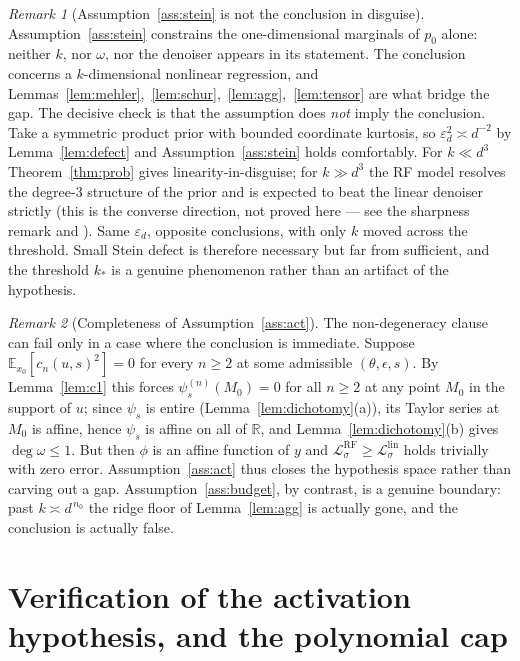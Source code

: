 \documentclass[11pt]{article}
\theoremstyle{remark}
\newtheorem{remark}{Remark}
\newcommand{\E}{\mathbb{E}}
\newcommand{\R}{\mathbb{R}}
\begin{document}
\begin{remark}[Assumption~\ref{ass:stein} is not the conclusion in disguise]\label{rem:noncirc}
Assumption~\ref{ass:stein} constrains the one-dimensional marginals of $p_0$ alone: neither $k$, nor $\omega$, nor the denoiser appears in its statement. The conclusion concerns a $k$-dimensional nonlinear regression, and Lemmas~\ref{lem:mehler},~\ref{lem:schur},~\ref{lem:agg},~\ref{lem:tensor} are what bridge the gap. The decisive check is that the assumption does \emph{not} imply the conclusion. Take a symmetric product prior with bounded coordinate kurtosis, so $\varepsilon_d^2 \asymp d^{-2}$ by Lemma~\ref{lem:defect} and Assumption~\ref{ass:stein} holds comfortably. For $k \ll d^{3}$ Theorem~\ref{thm:prob} gives linearity-in-disguise; for $k \gg d^{3}$ the RF model resolves the degree-3 structure of the prior and is expected to beat the linear denoiser strictly (this is the converse direction, not proved here --- see the sharpness remark and \cite{MMM21,Ghorbani}). Same $\varepsilon_d$, opposite conclusions, with only $k$ moved across the threshold. Small Stein defect is therefore necessary but far from sufficient, and the threshold $k_*$ is a genuine phenomenon rather than an artifact of the hypothesis.
\end{remark}

\begin{remark}[Completeness of Assumption~\ref{ass:act}]\label{rem:a2-complete}
The non-degeneracy clause can fail only in a case where the conclusion is immediate. Suppose $\E_{x_0}[c_n(u,s)^2] = 0$ for every $n \ge 2$ at some admissible $(\theta,\epsilon,s)$. By Lemma~\ref{lem:c1} this forces $\psi_s^{(n)}(M_0) = 0$ for all $n \ge 2$ at any point $M_0$ in the support of $u$; since $\psi_s$ is entire (Lemma~\ref{lem:dichotomy}(a)), its Taylor series at $M_0$ is affine, hence $\psi_s$ is affine on all of $\R$, and Lemma~\ref{lem:dichotomy}(b) gives $\deg\omega \le 1$. But then $\phi$ is an affine function of $y$ and $\mathcal L^{\mathrm{RF}}_\sigma \ge \mathcal L^{\mathrm{lin}}_\sigma$ holds trivially with zero error. Assumption~\ref{ass:act} thus closes the hypothesis space rather than carving out a gap. Assumption~\ref{ass:budget}, by contrast, is a genuine boundary: past $k \asymp d^{\,n_0}$ the ridge floor of Lemma~\ref{lem:agg} is actually gone, and the conclusion is actually false.
\end{remark}

\section{Verification of the activation hypothesis, and the polynomial cap}\label{sec:activation}
\end{document}
